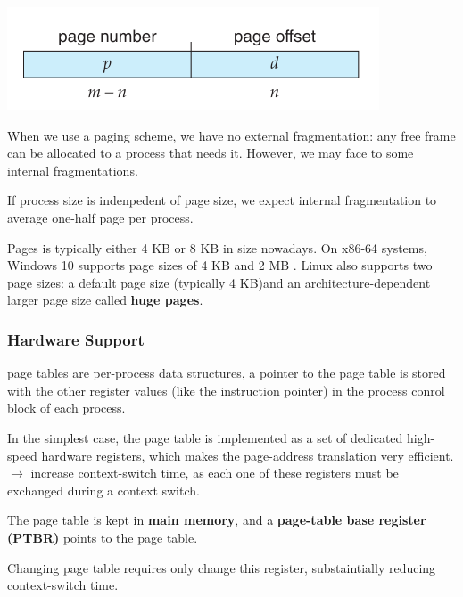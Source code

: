 \documentclass[10pt]{article}
\newcommand{\tf}{\textbf}
\newcommand{\rarrow}{\rightarrow}
\begin{document}
\bigbreak
\includegraphics[scale = 0.7]{find-logic-address.png}
\bigbreak

\par{When we use a paging scheme, we have no external fragmentation: any free frame can be allocated to a process that needs it. However, we may face to some internal fragmentations.}

\par{If process size is indenpedent of page size, we expect internal fragmentation to average one-half page per process.}

\par{Pages is typically either 4 KB or 8 KB in size nowadays. On
x86-64 systems, Windows 10 supports page sizes of 4 KB and 2 MB . Linux also supports two page sizes: a default page size (typically 4 KB)and an architecture-dependent larger page size called \tf{huge pages}.}

\subsubsection{Hardware Support}

\par{page tables are per-process data structures, a pointer to the page table is stored with the other register values (like the instruction pointer) in the process conrol block of each process.} \\

\par{In the simplest case, the page table is implemented as a set of dedicated high-speed hardware registers, which makes the page-address translation very efficient. $\rarrow$ increase context-switch time, as each one of these registers must be exchanged during a context switch.} \\

\par{The page table is kept in \tf{main memory}, and a \tf{page-table base register (PTBR)} points to the page table.} \\

\par{Changing page table requires only change this register, substaintially reducing context-switch time.} \\
\end{document}
